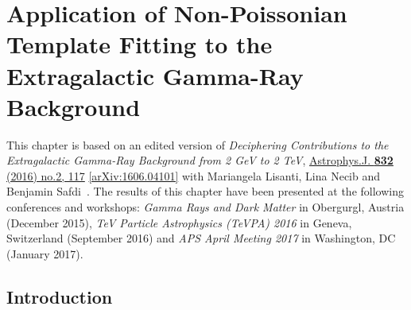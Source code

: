 \chapter{Application of Non-Poissonian Template Fitting to the Extragalactic Gamma-Ray Background}
\label{ch:igrb}

\setcounter{footnote}{0}

This chapter is based on an edited version of \emph{Deciphering Contributions to the Extragalactic Gamma-Ray Background from 2 GeV to 2 TeV},  \href{http://iopscience.iop.org/article/10.3847/0004-637X/832/2/117/meta}{Astrophys.J. \textbf{832} (2016) no.2, 117} \href{https://arxiv.org/abs/1606.04101}{[arXiv:1606.04101]} with Mariangela Lisanti, Lina Necib and Benjamin Safdi~\cite{Lisanti:2016jub}. The results of this chapter have been presented at the following conferences and workshops: \emph{Gamma Rays and Dark Matter} in Obergurgl, Austria (December 2015), \emph{TeV Particle Astrophysics (TeVPA) 2016} in Geneva, Switzerland (September 2016) and \emph{APS April Meeting 2017} in Washington, DC (January 2017).

\section{Introduction}

